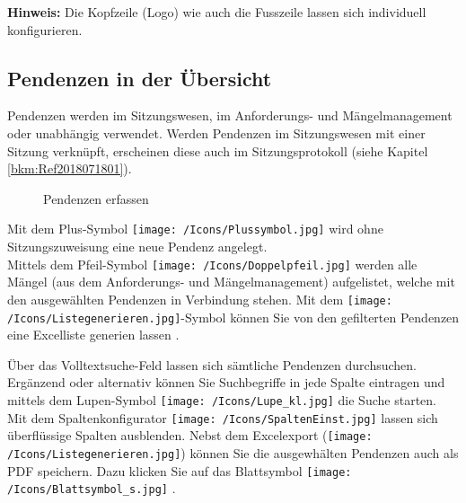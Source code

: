 \textbf{Hinweis:} Die Kopfzeile (Logo) wie auch die Fusszeile lassen sich individuell konfigurieren.

\clearpage
\subsection{Pendenzen in der Übersicht}
\label{bkm:Ref2018071802}

Pendenzen werden im Sitzungswesen, im Anforderungs- und Mängelmanagement oder unabhängig verwendet. Werden Pendenzen im Sitzungswesen mit einer Sitzung verknüpft, erscheinen diese auch im  Sitzungsprotokoll (siehe Kapitel \ref{bkm:Ref2018071801}).

\begin{figure}[H]
\caption{Pendenzen erfassen}
\end{figure}

Mit dem Plus-Symbol \texttt{[image: /Icons/Plussymbol.jpg]}  wird ohne Sitzungszuweisung eine neue Pendenz angelegt.\\
Mittels dem Pfeil-Symbol \texttt{[image: /Icons/Doppelpfeil.jpg]}  werden alle Mängel (aus dem Anforderungs- und Mängelmanagement) aufgelistet, welche mit den ausgewählten Pendenzen in Verbindung stehen.
Mit dem \texttt{[image: /Icons/Listegenerieren.jpg]}-Symbol können Sie von den gefilterten Pendenzen eine Excelliste generien lassen .

\vspace{\baselineskip}

Über das Volltextsuche-Feld  lassen sich sämtliche Pendenzen durchsuchen. Ergänzend oder alternativ können Sie Suchbegriffe in jede Spalte eintragen und mittels dem Lupen-Symbol \texttt{[image: /Icons/Lupe\_kl.jpg]}  die Suche starten.\\
Mit dem Spaltenkonfigurator \texttt{[image: /Icons/SpaltenEinst.jpg]}  lassen sich überflüssige Spalten ausblenden.
Nebst dem Excelexport (\texttt{[image: /Icons/Listegenerieren.jpg]}) können Sie die ausgewhälten Pendenzen auch als PDF speichern. Dazu klicken Sie auf das Blattsymbol \texttt{[image: /Icons/Blattsymbol\_s.jpg]} .

